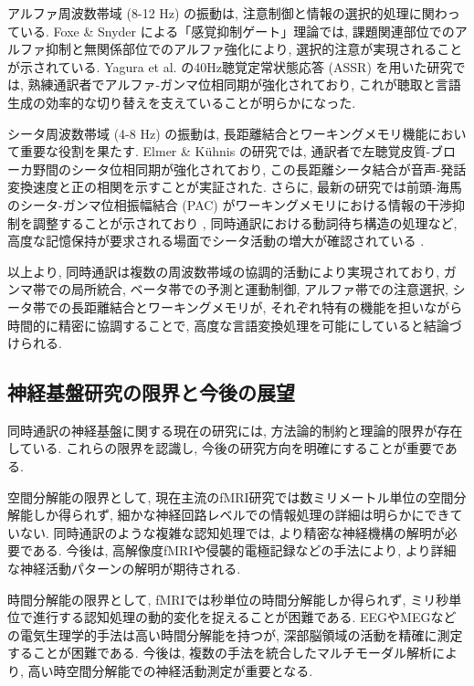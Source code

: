 アルファ周波数帯域 (8-12 Hz) の振動は, 注意制御と情報の選択的処理に関わっている.
Foxe & Snyder \cite{foxe2011} による「感覚抑制ゲート」理論では, 課題関連部位でのアルファ抑制と無関係部位でのアルファ強化により, 選択的注意が実現されることが示されている.
Yagura et al. \cite{yagura2021selective} の40Hz聴覚定常状態応答 (ASSR) を用いた研究では, 熟練通訳者でアルファ-ガンマ位相同期が強化されており, これが聴取と言語生成の効率的な切り替えを支えていることが明らかになった.

シータ周波数帯域 (4-8 Hz) の振動は, 長距離結合とワーキングメモリ機能において重要な役割を果たす.
Elmer & Kühnis \cite{elmer2016functional} の研究では, 通訳者で左聴覚皮質-ブローカ野間のシータ位相同期が強化されており, この長距離シータ結合が音声-発話変換速度と正の相関を示すことが実証された.
さらに, 最新の研究では前頭-海馬のシータ-ガンマ位相振幅結合 (PAC) がワーキングメモリにおける情報の干渉抑制を調整することが示されており \cite{tgpac2024}, 同時通訳における動詞待ち構造の処理など, 高度な記憶保持が要求される場面でシータ活動の増大が確認されている \cite{wmalpha2024}.

以上より, 同時通訳は複数の周波数帯域の協調的活動により実現されており, ガンマ帯での局所統合, ベータ帯での予測と運動制御, アルファ帯での注意選択, シータ帯での長距離結合とワーキングメモリが, それぞれ特有の機能を担いながら時間的に精密に協調することで, 高度な言語変換処理を可能にしていると結論づけられる.

\subsection{神経基盤研究の限界と今後の展望}

同時通訳の神経基盤に関する現在の研究には, 方法論的制約と理論的限界が存在している.
これらの限界を認識し, 今後の研究方向を明確にすることが重要である.

空間分解能の限界として, 現在主流のfMRI研究では数ミリメートル単位の空間分解能しか得られず, 細かな神経回路レベルでの情報処理の詳細は明らかにできていない.
同時通訳のような複雑な認知処理では, より精密な神経機構の解明が必要である.
今後は, 高解像度fMRIや侵襲的電極記録などの手法により, より詳細な神経活動パターンの解明が期待される.

時間分解能の限界として, fMRIでは秒単位の時間分解能しか得られず, ミリ秒単位で進行する認知処理の動的変化を捉えることが困難である.
EEGやMEGなどの電気生理学的手法は高い時間分解能を持つが, 深部脳領域の活動を精確に測定することが困難である.
今後は, 複数の手法を統合したマルチモーダル解析により, 高い時空間分解能での神経活動測定が重要となる.

